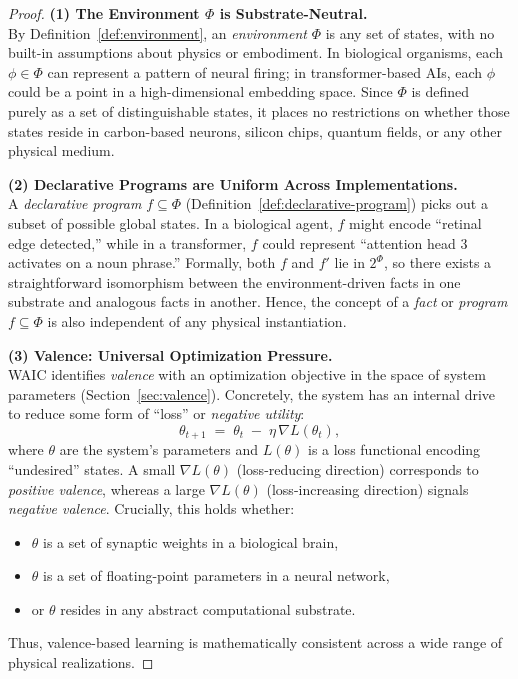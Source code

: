 \documentclass[12pt,letterpaper]{article}
\begin{document}
\begin{proof}
\noindent \textbf{(1) The Environment $\Phi$ is Substrate-Neutral.}\\
By Definition~\ref{def:environment}, an \emph{environment} $\Phi$ is any set of states, with no built-in assumptions about physics or embodiment. In biological organisms, each $\phi\in\Phi$ can represent a pattern of neural firing; in transformer-based AIs, each $\phi$ could be a point in a high-dimensional embedding space. Since $\Phi$ is defined purely as a set of distinguishable states, it places no restrictions on whether those states reside in carbon-based neurons, silicon chips, quantum fields, or any other physical medium.

\vspace{1em}\noindent \textbf{(2) Declarative Programs are Uniform Across Implementations.}\\
A \emph{declarative program} $f \subseteq \Phi$ (Definition~\ref{def:declarative-program}) picks out a subset of possible global states. In a biological agent, $f$ might encode ``retinal edge detected,'' while in a transformer, $f$ could represent ``attention head 3 activates on a noun phrase.'' Formally, both $f$ and $f'$ lie in $2^\Phi$, so there exists a straightforward isomorphism between the environment-driven facts in one substrate and analogous facts in another. Hence, the concept of a \emph{fact} or \emph{program} $f \subseteq \Phi$ is also independent of any physical instantiation.

\vspace{1em}\noindent \textbf{(3) Valence: Universal Optimization Pressure.}\\
WAIC identifies \emph{valence} with an optimization objective in the space of system parameters (Section~\ref{sec:valence}). Concretely, the system has an internal drive to reduce some form of ``loss'' or \emph{negative utility}:
\[
    \theta_{t+1} \;=\; \theta_t \;-\; \eta\,\nabla L(\theta_t),
\]
where $\theta$ are the system's parameters and $L(\theta)$ is a loss functional encoding ``undesired'' states. A small $\nabla L(\theta)$ (loss-reducing direction) corresponds to \emph{positive valence}, whereas a large $\nabla L(\theta)$ (loss-increasing direction) signals \emph{negative valence}. Crucially, this holds whether:
\begin{itemize}[topsep=0pt,itemsep=0pt]
    \item $\theta$ is a set of synaptic weights in a biological brain,
    \item $\theta$ is a set of floating-point parameters in a neural network,
    \item or $\theta$ resides in any abstract computational substrate.
\end{itemize}
Thus, valence-based learning is mathematically consistent across a wide range of physical realizations.


\end{proof}
\end{document}
